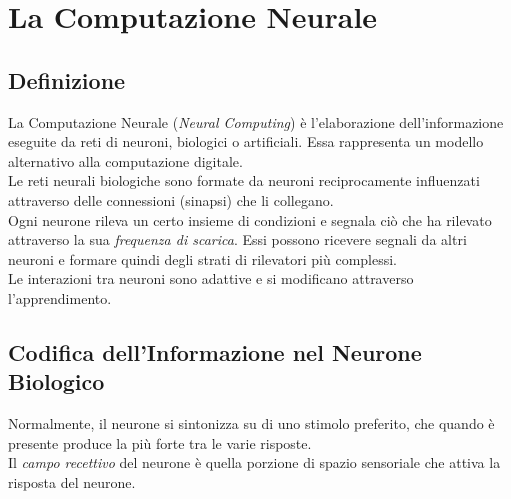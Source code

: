 \newpage
\section{La Computazione Neurale}

\subsection{Definizione}
La Computazione Neurale (\textit{Neural Computing}) è l'elaborazione dell'informazione eseguite da reti di neuroni, biologici o artificiali. Essa rappresenta un modello alternativo alla computazione digitale.\\
Le reti neurali biologiche sono formate da neuroni reciprocamente influenzati attraverso delle connessioni (sinapsi) che li collegano.\\
Ogni neurone rileva un certo insieme di condizioni e segnala ciò che ha rilevato attraverso la sua \textit{frequenza di scarica}. Essi possono ricevere segnali da altri neuroni e formare quindi degli strati di rilevatori più complessi.\\
Le interazioni tra neuroni sono adattive e si modificano attraverso l'apprendimento.

\subsection{Codifica dell'Informazione nel Neurone Biologico}
Normalmente, il neurone si sintonizza su di uno stimolo preferito, che quando è presente produce la più forte tra le varie risposte.\\
Il \textit{campo recettivo} del neurone è quella porzione di spazio sensoriale che attiva la risposta del neurone.
